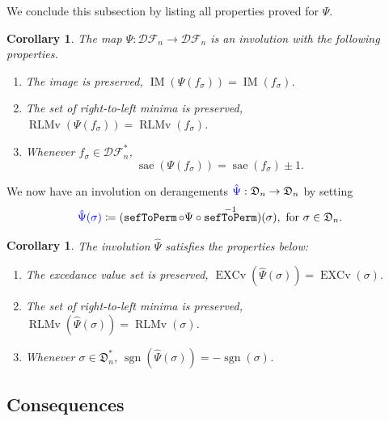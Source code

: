 \documentclass[reqno]{amsart}
\newtheorem{corollary}[theorem]{Corollary}
\theoremstyle{definition}
\newcommand{\defin}[1]{%
\relax\ifmmode%
\textcolor{blue}{#1}%
\else\textcolor{blue}{\emph{#1}}%
\fi%
}
\newcommand{\dArr}{\mathfrak{D}}
\newcommand{\DSEF}{\mathcal{DF}}%
\newcommand{\frether}{\hat{\Psi}}
\newcommand{\fretherD}{\Psi}
\DeclareMathOperator{\sgn}{sgn}
\DeclareMathOperator{\EXCv}{EXCv}
\DeclareMathOperator{\RLMv}{RLMv}
\DeclareMathOperator{\aexc}{sae} %
\DeclareMathOperator{\supp}{IM}
\DeclareMathOperator{\sefToPerm}{\mathtt{sefToPerm}}
\begin{document}
\medskip

We conclude this subsection by listing all properties proved for $\fretherD$.
\begin{corollary}\label{cor:fretherDProps}
The map $\fretherD:\DSEF_n\longrightarrow \DSEF_n$
is an involution with the following properties.
%
\begin{enumerate}[label=(\roman*)]
\item 
	The image is preserved, $\supp(\fretherD(f_\sigma )) = \supp( f_\sigma )$.
\item 
	The set of right-to-left minima is preserved,
	$\RLMv( \fretherD(f_\sigma ) ) = \RLMv( f_\sigma )$.
\item 
	Whenever $f_\sigma \in \DSEF^*_n$, 
	\[
	\aexc(\fretherD( f_\sigma ) ) = \aexc( f_\sigma)\pm 1.
	\]
\end{enumerate} 
\end{corollary}
We now have an involution on derangements $\defin{\frether}:\dArr_n \to \dArr_n$
by setting
\[
\defin{\frether(\sigma)} \coloneqq (\sefToPerm \circ \fretherD \circ \sefToPerm^{-1})(\sigma),
\text{ for $\sigma \in \dArr_n$}.
\]

\begin{corollary}\label{cor:frethermap}
The involution $\frether$ satisfies the properties below:
\begin{enumerate}[label=(\roman*)]
	\item The excedance value set is preserved,  $\EXCv(\frether(\sigma)) = \EXCv(\sigma).$
	\item 
	The set of right-to-left minima is preserved,
	$\RLMv( \frether(\sigma)) = \RLMv(\sigma )$.
	\item 
		Whenever $\sigma \in \dArr^*_n$, 
		$\sgn(\frether(\sigma) ) = -\sgn( \sigma)$.
\end{enumerate}
\end{corollary}
 
\subsection{Consequences}
\end{document}
